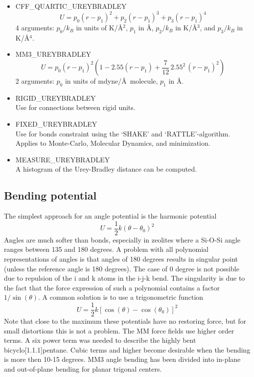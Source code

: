 \begin{itemize}
  \item{CFF\_QUARTIC\_UREYBRADLEY}
  \begin{equation}
  U=p_0 \left(r-p_1\right)^2+ p_2 \left(r-p_1\right)^3+ p_3 \left(r-p_1\right)^4
  \end{equation}
  4 arguments: $p_0/k_B$ in units of K/\AA$^2$, $p_1$ in \AA, $p_2/k_B$ in K/\AA$^3$, and $p_3/k_B$ in K/\AA$^4$.

  \item{MM3\_UREYBRADLEY}
  \begin{equation}
  U=p_0 \left(r-p_1\right)^2\left(1-2.55\left(r-p_1\right)+\frac{7}{12}\,2.55^2\,\left(r-p_1\right)^2\right)
  \end{equation}
  2 arguments: $p_0$ in units of mdyne/\AA\, molecule, $p_1$ in \AA.

 \item{RIGID\_UREYBRADLEY}\\
  Use for connections between rigid units.

  \item{FIXED\_UREYBRADLEY}\\
  Use for bonds constraint using the `SHAKE' and `RATTLE'-algorithm. Applies to Monte-Carlo, Molecular Dynamics, and minimization.

  \item{MEASURE\_UREYBRADLEY}\\
  A histogram of the Urey-Bradley distance can be computed.

\end{itemize}

\subsection{Bending potential}

The simplest approach for an angle potential is the harmonic potential
\begin{equation}
  U=\frac{1}{2} k \left(\theta-\theta_0\right)^2
\end{equation}
Angles are much softer than bonds, especially in zeolites where a Si-O-Si angle ranges 
between 135 and 180 degrees.
A problem with all polynomial representations of angles is that angles of 180 degrees results
in singular point (unless the reference angle is 180 degrees). The case of 0 degree is not possible
due to repulsion of the i and k atoms in the i-j-k bend.
The singularity is due to the fact that the force expression of such a polynomial
contains a factor $1/\sin\left(\theta\right)$. A common solution is to use a trigonometric function
\begin{equation}
  U=\frac{1}{2} k \left[\cos\left(\theta\right)-\cos\left(\theta_0\right)\right]^2
\end{equation}
Note that close to the maximum these potentials have no restoring force, but for small distortions this
is not a problem.
The MM force fields use higher order terms. A six power term was needed to describe the highly bent
bicyclo[1.1.1]pentane. Cubic terms and higher become desirable when the bending is more then 10-15 degrees.
MM3 angle bending has been divided into in-plane and out-of-plane bending for planar trigonal centers.

